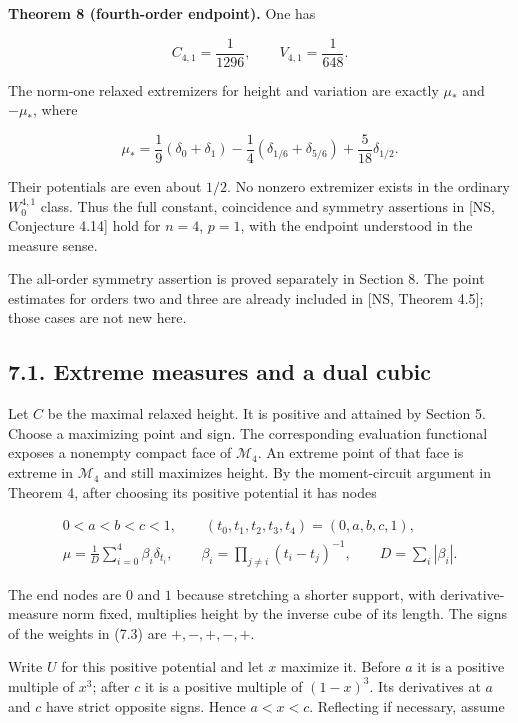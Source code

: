 \documentclass[11pt]{article}
\begin{document}
\textbf{Theorem 8 (fourth-order endpoint).} One has

\[
C_{4,1}=\frac1{1296},\qquad V_{4,1}=\frac1{648}.
\tag{7.1}
\]

The norm-one relaxed extremizers for height and variation are exactly
\(\mu_*\) and \(-\mu_*\), where

\[
\mu_* =\frac19(\delta_0+\delta_1)
-\frac14(\delta_{1/6}+\delta_{5/6})
+\frac5{18}\delta_{1/2}.
\tag{7.2}
\]

Their potentials are even about \(1/2\). No nonzero extremizer exists in
the ordinary \(W_0^{4,1}\) class. Thus the full constant, coincidence
and symmetry assertions in {[}NS, Conjecture 4.14{]} hold for \(n=4\),
\(p=1\), with the endpoint understood in the measure sense.

The all-order symmetry assertion is proved separately in Section 8. The
point estimates for orders two and three are already included in {[}NS,
Theorem 4.5{]}; those cases are not new here.

\subsection{7.1. Extreme measures and a dual
cubic}\label{extreme-measures-and-a-dual-cubic}

Let \(C\) be the maximal relaxed height. It is positive and attained by
Section 5. Choose a maximizing point and sign. The corresponding
evaluation functional exposes a nonempty compact face of
\(\mathcal M_4\). An extreme point of that face is extreme in
\(\mathcal M_4\) and still maximizes height. By the moment-circuit
argument in Theorem 4, after choosing its positive potential it has
nodes

\[
\begin{gathered}
0<a<b<c<1,\qquad (t_0,t_1,t_2,t_3,t_4)=(0,a,b,c,1),\\
\mu=\frac1D\sum_{i=0}^4\beta_i\delta_{t_i},\qquad
\beta_i=\prod_{j\ne i}(t_i-t_j)^{-1},\qquad D=\sum_i|\beta_i|.
\end{gathered}
\tag{7.3}
\]

The end nodes are \(0\) and \(1\) because stretching a shorter support,
with derivative-measure norm fixed, multiplies height by the inverse
cube of its length. The signs of the weights in (7.3) are \(+,-,+,-,+\).

Write \(U\) for this positive potential and let \(x\) maximize it.
Before \(a\) it is a positive multiple of \(x^3\); after \(c\) it is a
positive multiple of \((1-x)^3\). Its derivatives at \(a\) and \(c\)
have strict opposite signs. Hence \(a<x<c\). Reflecting if necessary,
assume
\end{document}
